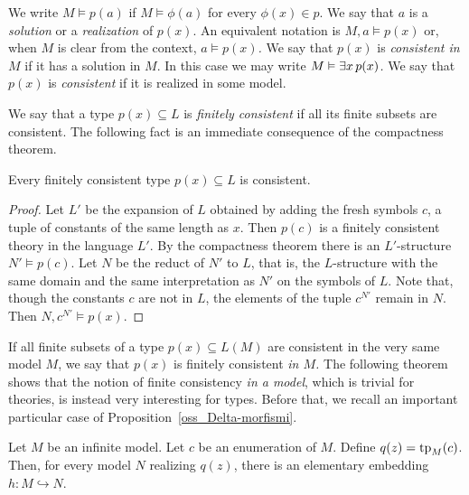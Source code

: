 We write \emph{$M\models p(a)$} if $M\models\phi(a)$ for every $\phi(x)\in p$.
We say that $a$ is a \emph{solution\/} or a \emph{realization\/} of $p(x)$.
An equivalent notation is \emph{$M,a\models p(x)$} or, when $M$ is clear from the context, \emph{$a\models p(x)$.}
We say that $p(x)$ is \emph{consistent in $M$\/} if it has a solution in $M$.
In this case we may write \emph{$M\vDash\exists x\,p(x)$.}
We say that $p(x)$ is \emph{consistent\/} if it is realized in some model.

We say that a type $p(x)\subseteq L$ is \emph{finitely consistent\/} if all its finite subsets are consistent.
The following fact is an immediate consequence of the compactness theorem.

\begin{fact}\label{fact_compattezzatipi}
Every finitely consistent type $p(x)\subseteq L$ is consistent.
\end{fact}

  \begin{proof}
  Let $L'$ be the expansion of $L$ obtained by adding the fresh symbols $c$, a tuple of constants of the same length as $x$.
  Then $p(c)$ is a finitely consistent theory in the language $L'$. By the compactness theorem there is an $L'$-structure $N'\models p(c)$.
  Let $N$ be the reduct of $N'$ to $L$, that is, the $L$-structure with the same domain and the same interpretation as $N'$ on the symbols of $L$.
  Note that, though the constants $c$ are not in $L$, the elements of the tuple $c^{N'}$ remain in $N$.
  Then $N,c^{N'}\models p(x)$.
\end{proof}

If all finite subsets of a type $p(x)\subseteq L(M)$ are consistent in the very same model $M$, we say that $p(x)$ is finitely consistent \emph{in $M$.}
The following theorem shows that the notion of finite consistency \textit{in a model}, which is trivial
for theories, is instead very interesting for types.
Before that, we recall an important particular case of Proposition~\ref{oss_Delta-morfismi}. 

\begin{lemma}\label{lem_el_diag}
    Let $M$ be an infinite model.
    Let $c$ be an enumeration of $M$.
    Define $q(z)={\rm tp}_M(c)$.
    Then, for every model $N$ realizing $q(z)$, there is an elementary embedding $h:M\hookrightarrow N$. 
\end{lemma}

